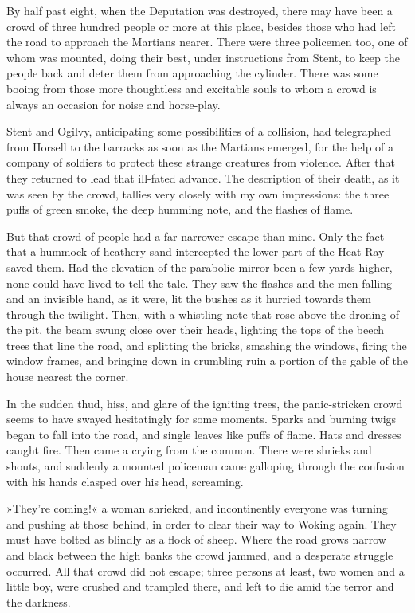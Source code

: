 By half past eight, when the Deputation was destroyed, there may have been a crowd of three hundred people or more at this place, besides those who had left the road to approach the Martians nearer. There were three policemen too, one of whom was mounted, doing their best, under instructions from Stent, to keep the people back and deter them from approaching the cylinder. There was some booing from those more thoughtless and excitable souls to whom a crowd is always an occasion for noise and horse-play.

Stent and Ogilvy, anticipating some possibilities of a collision, had telegraphed from Horsell to the barracks as soon as the Martians emerged, for the help of a company of soldiers to protect these strange creatures from violence. After that they returned to lead that ill-fated advance. The description of their death, as it was seen by the crowd, tallies very closely with my own impressions: the three puffs of green smoke, the deep humming note, and the flashes of flame.

But that crowd of people had a far narrower escape than mine. Only the fact that a hummock of heathery sand intercepted the lower part of the Heat-Ray saved them. Had the elevation of the parabolic mirror been a few yards higher, none could have lived to tell the tale. They saw the flashes and the men falling and an invisible hand, as it were, lit the bushes as it hurried towards them through the twilight. Then, with a whistling note that rose above the droning of the pit, the beam swung close over their heads, lighting the tops of the beech trees that line the road, and splitting the bricks, smashing the windows, firing the window frames, and bringing down in crumbling ruin a portion of the gable of the house nearest the corner.

In the sudden thud, hiss, and glare of the igniting trees, the panic-stricken crowd seems to have swayed hesitatingly for some moments. Sparks and burning twigs began to fall into the road, and single leaves like puffs of flame. Hats and dresses caught fire. Then came a crying from the common. There were shrieks and shouts, and suddenly a mounted policeman came galloping through the confusion with his hands clasped over his head, screaming.



»They're coming!« a woman shrieked, and incontinently everyone was turning and pushing at those behind, in order to clear their way to Woking again. They must have bolted as blindly as a flock of sheep. Where the road grows narrow and black between the high banks the crowd jammed, and a desperate struggle occurred. All that crowd did not escape; three persons at least, two women and a little boy, were crushed and trampled there, and left to die amid the terror and the darkness.

